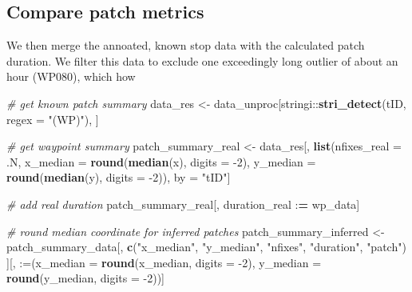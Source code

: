 \documentclass[
]{scrartcl}
\newenvironment{Shaded}{}{}
\newcommand{\CommentTok}[1]{\textcolor[rgb]{0.38,0.63,0.69}{\textit{#1}}}
\newcommand{\DataTypeTok}[1]{\textcolor[rgb]{0.56,0.13,0.00}{#1}}
\newcommand{\DecValTok}[1]{\textcolor[rgb]{0.25,0.63,0.44}{#1}}
\newcommand{\ErrorTok}[1]{\textcolor[rgb]{1.00,0.00,0.00}{\textbf{#1}}}
\newcommand{\KeywordTok}[1]{\textcolor[rgb]{0.00,0.44,0.13}{\textbf{#1}}}
\newcommand{\NormalTok}[1]{#1}
\newcommand{\OperatorTok}[1]{\textcolor[rgb]{0.40,0.40,0.40}{#1}}
\newcommand{\StringTok}[1]{\textcolor[rgb]{0.25,0.44,0.63}{#1}}
\begin{document}
\hypertarget{compare-patch-metrics}{%
\subsection{Compare patch metrics}\label{compare-patch-metrics}}

We then merge the annoated, known stop data with the calculated patch duration.
We filter this data to exclude one exceedingly long outlier of about an hour (WP080), which how

\begin{Shaded}
\begin{Highlighting}[]
\CommentTok{\# get known patch summary}
\NormalTok{data\_res <{-}}\StringTok{ }\NormalTok{data\_unproc[stringi}\OperatorTok{::}\KeywordTok{stri\_detect}\NormalTok{(tID, }\DataTypeTok{regex =} \StringTok{"(WP)"}\NormalTok{), ]}

\CommentTok{\# get waypoint summary}
\NormalTok{patch\_summary\_real <{-}}\StringTok{ }\NormalTok{data\_res[, }\KeywordTok{list}\NormalTok{(}\DataTypeTok{nfixes\_real =}\NormalTok{ .N,}
                                      \DataTypeTok{x\_median =} \KeywordTok{round}\NormalTok{(}\KeywordTok{median}\NormalTok{(x), }\DataTypeTok{digits =} \DecValTok{{-}2}\NormalTok{),}
                                      \DataTypeTok{y\_median =} \KeywordTok{round}\NormalTok{(}\KeywordTok{median}\NormalTok{(y), }\DataTypeTok{digits =} \DecValTok{{-}2}\NormalTok{)), }
\NormalTok{                               by =}\StringTok{ "tID"}\NormalTok{]}

\CommentTok{\# add real duration}
\NormalTok{patch\_summary\_real[, duration\_real }\OperatorTok{:}\ErrorTok{=}\StringTok{ }\NormalTok{wp\_data]}

\CommentTok{\# round median coordinate for inferred patches}
\NormalTok{patch\_summary\_inferred <{-}}\StringTok{ }
\StringTok{  }\NormalTok{patch\_summary\_data[, }
                     \KeywordTok{c}\NormalTok{(}\StringTok{"x\_median"}\NormalTok{, }\StringTok{"y\_median"}\NormalTok{, }
                       \StringTok{"nfixes"}\NormalTok{, }\StringTok{"duration"}\NormalTok{, }\StringTok{"patch"}\NormalTok{)}
\NormalTok{                     ][, }\StringTok{\textasciigrave{}}\DataTypeTok{:=}\StringTok{\textasciigrave{}}\NormalTok{(}\DataTypeTok{x\_median =} \KeywordTok{round}\NormalTok{(x\_median, }\DataTypeTok{digits =} \DecValTok{{-}2}\NormalTok{),}
                              \DataTypeTok{y\_median =} \KeywordTok{round}\NormalTok{(y\_median, }\DataTypeTok{digits =} \DecValTok{{-}2}\NormalTok{))]}


\end{Highlighting}
\end{Shaded}
\end{document}
